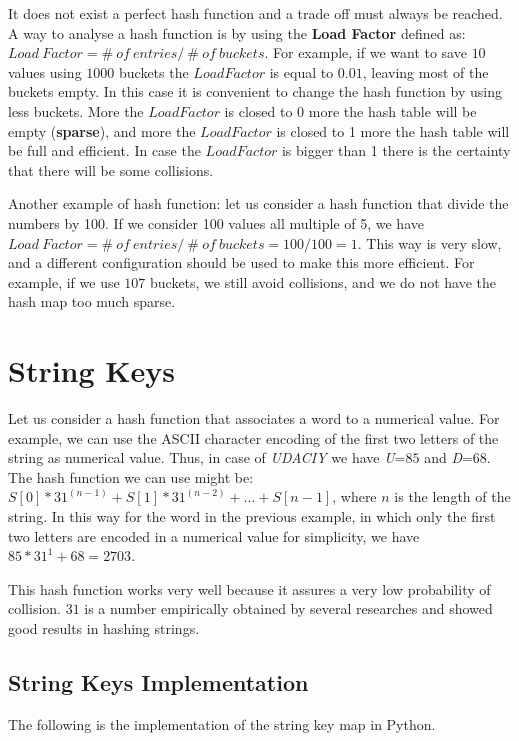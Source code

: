 It does not exist a perfect hash function and a trade off must always be reached. A way to analyse a hash function is by using the \textbf{Load Factor} defined as: \(Load \ Factor = \# \ of \ entries / \ \# \ of \ buckets\). For example, if we want to save \(10\) values using \(1000\) buckets the \(Load Factor\) is equal to \(0.01\), leaving most of the buckets empty. In this case it is convenient to change the hash function by using less buckets. More the \(Load Factor\) is closed to \(0\) more the hash table will be empty (\textbf{sparse}), and more the \(Load Factor\) is closed to 1 more the hash table will be full and efficient. In case the \(Load Factor\) is bigger than 1 there is the certainty that there will be some collisions.

Another example of hash function: let us consider a hash function that divide the numbers by 100. If we consider 100 values all multiple of 5, we have \(Load \ Factor = \# \ of \ entries / \ \# \ of \ buckets = 100/100 = 1\). This way is very slow, and a different configuration should be used to make this more efficient. For example, if we use \(107\) buckets, we still avoid collisions, and we do not have the hash map too much sparse.

\section{String Keys}
Let us consider a hash function that associates a word to a numerical value. For example, we can use the ASCII character encoding of the first two letters of the string as numerical value. Thus, in case of \textit{UDACIY} we have \textit{U}=\(85\) and \textit{D}=\(68\). The hash function we can use might be: \(S\left[0\right] * 31^{(n-1)} + S\left[1\right] * 31^{(n-2)} + \ldots + S\left[n-1\right]\), where \(n\) is the length of the string. In this way for the word in the previous example, in which only the first two letters are encoded in a numerical value for simplicity, we have \(85*31^{1} + 68 = 2703\).

This hash function works very well because it assures a very low probability of collision. \(31\) is a number empirically obtained by several researches and showed good results in hashing strings.

\subsection{String Keys Implementation}
The following is the implementation of the string key map in Python.

